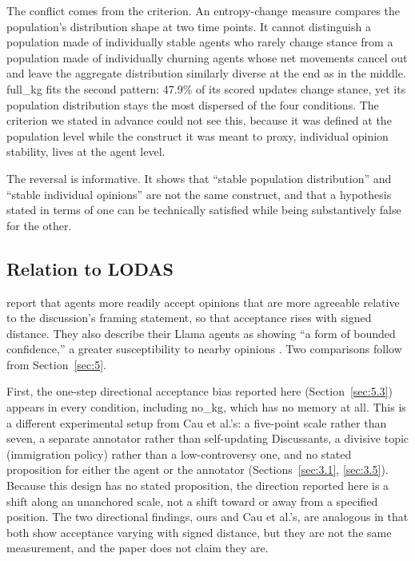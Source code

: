 \documentclass[11pt,a4paper]{article}
\newcommand{\cond}[1]{\textsf{#1}}
\begin{document}
The conflict comes from the criterion. An entropy-change measure compares the population's distribution shape at two time points. It cannot distinguish a population made of individually stable agents who rarely change stance from a population made of individually churning agents whose net movements cancel out and leave the aggregate distribution similarly diverse at the end as in the middle. \cond{full\_kg} fits the second pattern: 47.9\% of its scored updates change stance, yet its population distribution stays the most dispersed of the four conditions. The criterion we stated in advance could not see this, because it was defined at the population level while the construct it was meant to proxy, individual opinion stability, lives at the agent level.

The reversal is informative. It shows that ``stable population distribution'' and ``stable individual opinions'' are not the same construct, and that a hypothesis stated in terms of one can be technically satisfied while being substantively false for the other.

\subsection{Relation to LODAS}\label{sec:6.5}

\citet{cau2025selective} report that agents more readily accept opinions that are more agreeable relative to the discussion's framing statement, so that acceptance rises with signed distance. They also describe their Llama agents as showing ``a form of bounded confidence,'' a greater susceptibility to nearby opinions \citep{cau2025selective}. Two comparisons follow from Section~\ref{sec:5}.

First, the one-step directional acceptance bias reported here (Section~\ref{sec:5.3}) appears in every condition, including \cond{no\_kg}, which has no memory at all. This is a different experimental setup from Cau et al.'s: a five-point scale rather than seven, a separate annotator rather than self-updating Discussants, a divisive topic (immigration policy) rather than a low-controversy one, and no stated proposition for either the agent or the annotator (Sections~\ref{sec:3.1}, \ref{sec:3.5}). Because this design has no stated proposition, the direction reported here is a shift along an unanchored scale, not a shift toward or away from a specified position. The two directional findings, ours and Cau et al.'s, are analogous in that both show acceptance varying with signed distance, but they are not the same measurement, and the paper does not claim they are.
\end{document}
